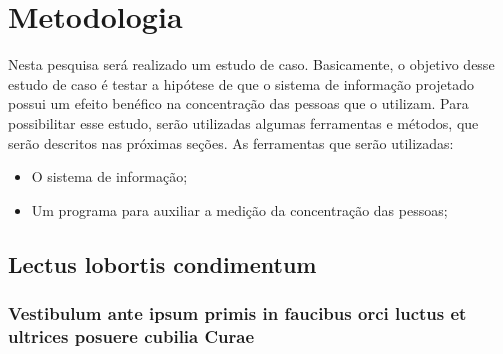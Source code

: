 \part{Metodologia}

Nesta pesquisa será realizado um estudo de caso. Basicamente, o objetivo desse
estudo de caso é testar a hipótese de que o sistema de informação projetado
possui um efeito benéfico na concentração das pessoas que o utilizam. Para 
possibilitar esse estudo, serão utilizadas algumas ferramentas e métodos, que serão descritos
nas próximas seções. As ferramentas que serão utilizadas:

\begin{itemize}
    \item O sistema de informação;
    \item Um programa para auxiliar a medição da concentração das pessoas;
\end{itemize}



\chapter{Lectus lobortis condimentum}

\section{Vestibulum ante ipsum primis in faucibus orci luctus et ultrices
posuere cubilia Curae}

\lipsum[21-22]